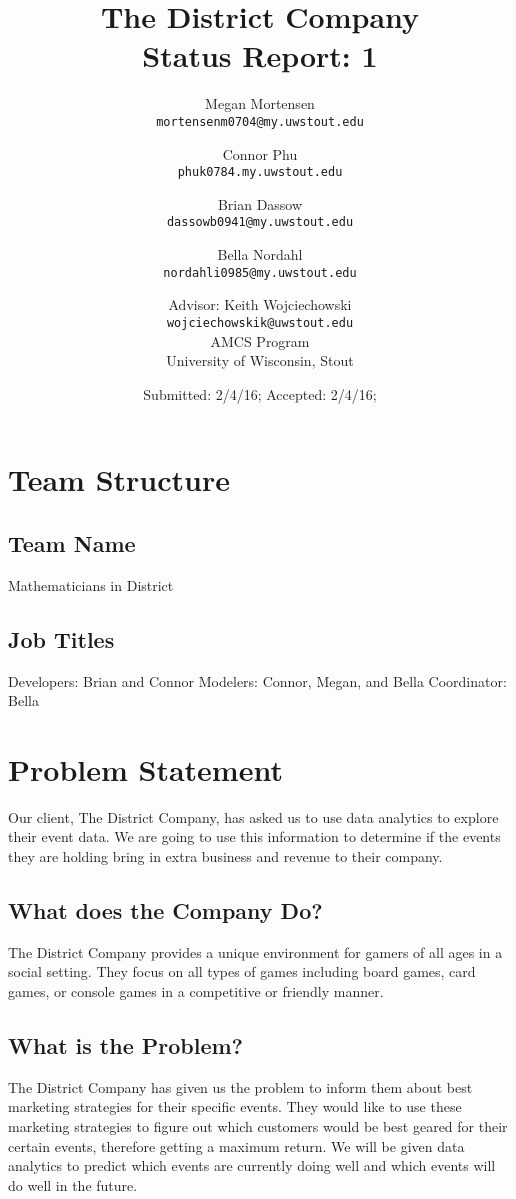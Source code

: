 \documentclass[11pt]{report}
\title{The District Company \\ Status Report: 1}
\author{
Megan Mortensen\\
\small \texttt{mortensenm0704@my.uwstout.edu}
\and
Connor Phu\\
\small \texttt{phuk0784.my.uwstout.edu}
\and
Brian Dassow\\
\small \texttt{dassowb0941@my.uwstout.edu}
\and
Bella Nordahl\\
\small \texttt{nordahli0985@my.uwstout.edu}
\and
Advisor: Keith Wojciechowski\\
\small \texttt{wojciechowskik@uwstout.edu}\\
\bigskip
AMCS Program\\
University of Wisconsin, Stout
}
\date{\small Submitted: 2/4/16;  Accepted: 2/4/16;}
\begin{document}
\maketitle

\section*{\hspace{-.5cm} Team Structure}

\subsection*{\hspace{-.5cm} Team Name}
Mathematicians in District

\subsection*{\hspace{-.5cm} Job Titles}
Developers: Brian and Connor
\newline
Modelers: Connor, Megan, and Bella
\newline
Coordinator: Bella

\section*{\hspace{-.5cm} Problem Statement}\label{intro}
Our client, The District Company, has asked us to use data analytics to explore
their event data. We are going to use this information to determine if the
events they are holding bring in extra business and revenue to their
company.

\subsection*{\hspace{-.5cm} What does the Company Do?}\label{overview}
The District Company provides a unique environment for gamers of all ages in a
social setting.  They focus on all types of games including board games, card
games, or console games in a competitive or friendly manner.

\subsection*{\hspace{-.5cm} What is the Problem?}\label{tech}
The District Company has given us the problem to inform them about best
marketing strategies for their specific events.  They would like to use these
marketing strategies to figure out which customers would be best geared for
their certain events, therefore getting a maximum return.  We will be given data
analytics to predict which events are currently doing well and which events will
do well in the future.
\end{document}
